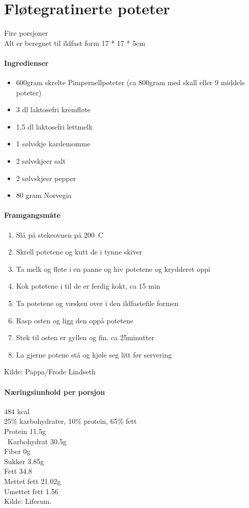 \section{﻿Fløtegratinerte poteter}
\label{flotegratinerte}
Fire porsjoner\\
Alt er beregnet til ildfast form 17 * 17 * 5cm

\paragraph{Ingredienser}
\begin{itemize}[noitemsep]
  \item 600gram skrelte Pimpernellpoteter (ca 800gram med skall eller 9 middels poteter)
  \item	3 dl laktosefri kremfløte
  \item 1,5 dl laktosefri lettmelk
  \item 1 sølvskje kardemomme
  \item 2 sølvskjeer salt
  \item 2 sølvskjeer pepper
  \item 80 gram Norvegia
\end{itemize}

\paragraph{Framgangsmåte}
\begin{enumerate}[noitemsep]
  \item Slå på stekeovnen på 200\degree~C
  \item Skrell potetene og kutt de i tynne skiver
  \item Ta melk og fløte i en panne og hiv potetene og krydderet oppi
  \item Kok potetene i til de er ferdig kokt, ca 15 min
  \item Ta potetene og væsken over i den ildfastefile formen
  \item Rasp osten og ligg den oppå potetene
  \item Stek til osten er gyllen og fin, ca 25minutter
  \item La gjerne potene stå og kjøle seg litt før servering
\end{enumerate}

Kilde: Pappa/Frode Lindseth\\


\paragraph{Næringsinnhold per porsjon}
484 kcal\\
25\% karbohydrater, 10\% protein, 65\% fett\\
Protein 11.5g\\\
Karbohydrat 30.5g\\
Fiber 0g\\
Sukker 3.85g\\
Fett 34.8\\
Mettet fett 21.02g\\
Umettet fett 1.56\\
Kilde: Lifesum.
